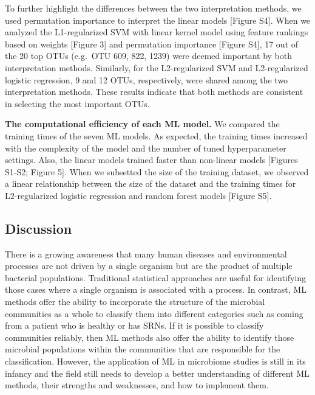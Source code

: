 \documentclass[11pt,]{article}
\begin{document}
To further highlight the differences between the two interpretation
methods, we used permutation importance to interpret the linear models
{[}Figure S4{]}. When we analyzed the L1-regularized SVM with linear
kernel model using feature rankings based on weights {[}Figure 3{]} and
permutation importance {[}Figure S4{]}, 17 out of the 20 top OTUs
(e.g.~OTU 609, 822, 1239) were deemed important by both interpretation
methods. Similarly, for the L2-regularized SVM and L2-regularized
logistic regression, 9 and 12 OTUs, respectively, were shared among the
two interpretation methods. These results indicate that both methods are
consistent in selecting the most important OTUs.

\textbf{The computational efficiency of each ML model.} We compared the
training times of the seven ML models. As expected, the training times
increased with the complexity of the model and the number of tuned
hyperparameter settings. Also, the linear models trained faster than
non-linear models {[}Figures S1-S2; Figure 5{]}. When we subsetted the
size of the training dataset, we observed a linear relationship between
the size of the dataset and the training times for L2-regularized
logistic regression and random forest models {[}Figure S5{]}.

\subsection{Discussion}\label{discussion}

There is a growing awareness that many human diseases and environmental
processes are not driven by a single organism but are the product of
multiple bacterial populations. Traditional statistical approaches are
useful for identifying those cases where a single organism is associated
with a process. In contrast, ML methods offer the ability to incorporate
the structure of the microbial communities as a whole to classify them
into different categories such as coming from a patient who is healthy
or has SRNs. If it is possible to classify communities reliably, then ML
methods also offer the ability to identify those microbial populations
within the communities that are responsible for the classification.
However, the application of ML in microbiome studies is still in its
infancy and the field still needs to develop a better understanding of
different ML methods, their strengths and weaknesses, and how to
implement them.
\end{document}

